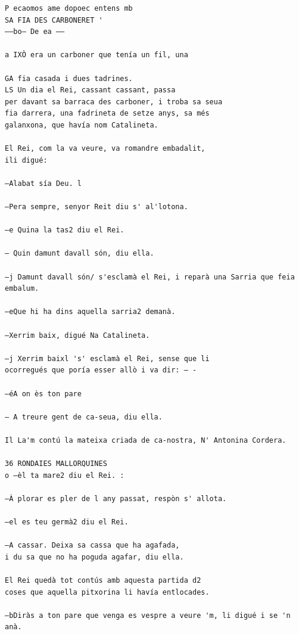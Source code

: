 \documentclass[
  letterpaper,
  DIV=11,
  numbers=noendperiod]{scrreprt}
\newenvironment{Shaded}{\begin{snugshade}}{\end{snugshade}}
\newcommand{\DecValTok}[1]{\textcolor[rgb]{0.68,0.00,0.00}{#1}}
\newcommand{\FunctionTok}[1]{\textcolor[rgb]{0.28,0.35,0.67}{#1}}
\newcommand{\NormalTok}[1]{\textcolor[rgb]{0.00,0.23,0.31}{#1}}
\newcommand{\SpecialCharTok}[1]{\textcolor[rgb]{0.37,0.37,0.37}{#1}}
\begin{document}
\begin{Shaded}
\end{Shaded}

\begin{verbatim}
P ecaomos ame dopoec entens mb
SA FIA DES CARBONERET '
——bo— De ea ——

a IXÒ era un carboner que tenía un fil, una

GA fia casada i dues tadrines.
LS Un dia el Rei, cassant cassant, passa
per davant sa barraca des carboner, i troba sa seua
fia darrera, una fadrineta de setze anys, sa més
galanxona, que havía nom Catalineta.

El Rei, com la va veure, va romandre embadalit,
ili digué:

—Alabat sía Deu. l

—Pera sempre, senyor Reit diu s' al'lotona.

—e Quina la tas2 diu el Rei.

— Quin damunt davall són, diu ella.

—j Damunt davall són/ s'esclamà el Rei, i reparà una Sarria que feia embalum.

—eQue hi ha dins aquella sarria2 demanà.

—Xerrim baix, digué Na Catalineta.

—j Xerrim baixl 's' esclamà el Rei, sense que li
ocorregués que poría esser allò i va dir: — -

—éA on ès ton pare

— A treure gent de ca-seua, diu ella.

Il La'm contú la mateixa criada de ca-nostra, N' Antonina Cordera.

36 RONDAIES MALLORQUINES
o —èl ta mare2 diu el Rei. :

—À plorar es pler de l any passat, respòn s' allota.

—el es teu germà2 diu el Rei.

—A cassar. Deixa sa cassa que ha agafada,
i du sa que no ha poguda agafar, diu ella.

El Rei quedà tot contús amb aquesta partida d2
coses que aquella pitxorina li havía entlocades.

—bDiràs a ton pare que venga es vespre a veure 'm, li digué i se 'n anà.


\end{verbatim}
\end{document}
